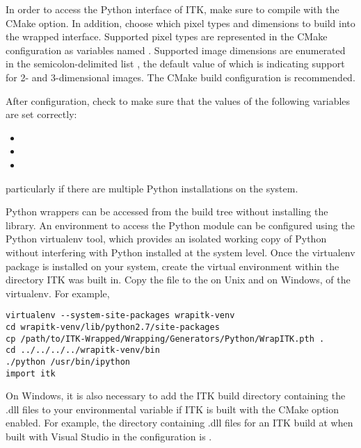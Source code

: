 In order to access the Python interface of ITK, make sure to compile with the
CMake  option. In addition, choose which pixel
types and dimensions to build into the wrapped interface. Supported pixel types
are represented in the CMake configuration as variables named
. Supported image dimensions are enumerated in the
semicolon-delimited list , the default value of which is
 indicating support for 2- and 3-dimensional images. The
 CMake build configuration is recommended.

After configuration, check to make sure that the values of the following variables
are set correctly:

\begin{itemize}
  \item {}
  \item {}
  \item {}
\end{itemize}

particularly if there are multiple Python installations on the system.

Python wrappers can be accessed from the build tree without installing the
library. An environment to access the  Python module can be configured
using the Python virtualenv tool, which provides an isolated working copy of
Python without interfering with Python installed at the system level. Once the
virtualenv package is installed on your system, create the virtual environment
within the directory ITK was built in. Copy the  file to
the  on Unix and  on
Windows, of the virtualenv. For example,

\small
\begin{verbatim}
virtualenv --system-site-packages wrapitk-venv
cd wrapitk-venv/lib/python2.7/site-packages
cp /path/to/ITK-Wrapped/Wrapping/Generators/Python/WrapITK.pth .
cd ../../../../wrapitk-venv/bin
./python /usr/bin/ipython
import itk
\end{verbatim}
\normalsize

On Windows, it is also necessary to add the ITK build directory containing the
.dll files to your  environmental variable if ITK is built with the
CMake option  enabled. For example, the directory
containing .dll files for an ITK build at
 when built with Visual Studio in the
 configuration is
.

